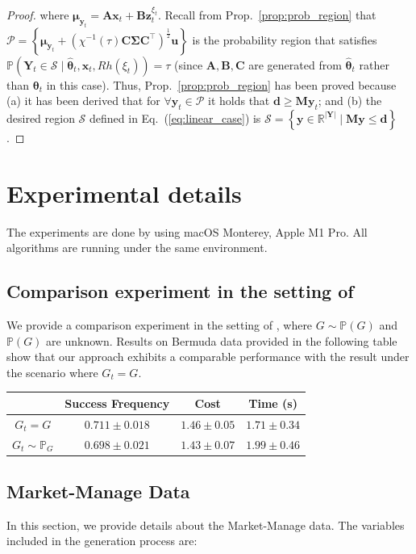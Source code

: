 \documentclass{article}
\theoremstyle{plain}
\theoremstyle{definition}
\theoremstyle{remark}
\def \Eq {Eq.}
\def \prop {Prop.}
\def \x {\mathbf{x}}
\def \sP {\mathcal{P}}
\def \sS {\mathcal{S}}
\def \Y {\mathbf{Y}}
\def \M {\mathbf{M}}
\def \A {\mathbf{A}}
\def \B {\mathbf{B}}
\def \C {\mathbf{C}}
\def \y {\mathbf{y}}
\def \z {\mathbf{z}}
\def \d {\mathbf{d}}
\def \u {\mathbf{u}}
\begin{document}
\begin{proof}
where $\bm{\mu}_{\y_t} = \A\x_t + \B\z^{\xi_t}_t$. Recall from \prop~\ref{prop:prob_region} that $\sP = \left\{\bm{\mu}_{\y_t} + \left(\chi^{-1}(\tau)\C\bm{\Sigma}\C^\top\right)^\frac{1}{2}\u\right\}$ is the probability region that satisfies $\mathbb{P}\left(\Y_t\in\sS \mid \hat{\bm{\theta}}_t, \x_t, Rh(\xi_t)\right) = \tau$ (since $\A,\B,\C$ are generated from $\hat{\bm{\theta}}_t$ rather than $\bm{\theta}_t$ in this case). 
Thus, \prop~\ref{prop:prob_region} has been proved because (a) it has been derived that for $\forall \y_t\in\sP$ it holds that $\d\geq \M\y_t$; and 
(b) the desired region $\sS$ defined in \Eq~(\ref{eq:linear_case}) is $\mathcal{S}=\left\{\mathbf{y} \in \mathbb{R}^{|\mathbf{Y}|} \mid \mathbf{M y} \leq \mathbf{d}\right\}$. 
\end{proof}



\section{Experimental details}
The experiments are done by using macOS Monterey, Apple M1 Pro. All algorithms are running under the same environment. 
\label{app:exp}

\subsection{Comparison experiment in the setting of \citet{qint2023srm}}
\label{app:compara}
  We provide a comparison experiment in the setting of \citet{qint2023srm}, where $G\sim \mathbb{P}(G)$ and $\mathbb{P}(G)$ are unknown. Results on Bermuda data provided in the following table show that our approach exhibits a comparable performance with the result under the scenario where $G_t=G$. 
  \begin{table}[h]
    \centering
    \begin{tabular}{|c|c|c|c|}
    \hline
    & Success Frequency & Cost & Time (s) \\
    \hline
    $G_t=G$ & $0.711\pm0.018$ & $1.46\pm0.05$ & $1.71\pm0.34$ \\
    \hline
    $G_t\sim \mathbb{P}_G$ & $0.698\pm0.021$ & $1.43\pm0.07$ & $1.99\pm0.46$ \\
    \hline
    \end{tabular}
  \end{table}



\subsection{Market-Manage Data}
In this section, we provide details about the Market-Manage data. 
The variables included in the generation process are: 
\end{document}
